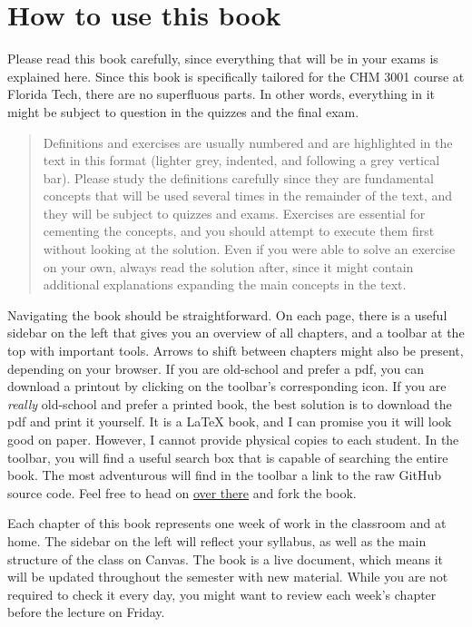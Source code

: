 \documentclass[
]{book}
\theoremstyle{definition}
\theoremstyle{definition}
\theoremstyle{definition}
\theoremstyle{remark}
\begin{document}
\hypertarget{how-to-use-this-book}{%
\section*{How to use this book}\label{how-to-use-this-book}}

Please read this book carefully, since everything that will be in your exams is explained here.
Since this book is specifically tailored for the CHM 3001 course at Florida Tech, there are no superfluous parts. In other words, everything in it might be subject to question in the quizzes and the final exam.

\begin{quote}
Definitions and exercises are usually numbered and are highlighted in the text in this format (lighter grey, indented, and following a grey vertical bar). Please study the definitions carefully since they are fundamental concepts that will be used several times in the remainder of the text, and they will be subject to quizzes and exams. Exercises are essential for cementing the concepts, and you should attempt to execute them first without looking at the solution. Even if you were able to solve an exercise on your own, always read the solution after, since it might contain additional explanations expanding the main concepts in the text.
\end{quote}

Navigating the book should be straightforward. On each page, there is a useful sidebar on the left that gives you an overview of all chapters, and a toolbar at the top with important tools. Arrows to shift between chapters might also be present, depending on your browser. If you are old-school and prefer a pdf, you can download a printout by clicking on the toolbar's corresponding icon. If you are \emph{really} old-school and prefer a printed book, the best solution is to download the pdf and print it yourself. It is a LaTeX book, and I can promise you it will look good on paper. However, I cannot provide physical copies to each student. In the toolbar, you will find a useful search box that is capable of searching the entire book. The most adventurous will find in the toolbar a link to the raw GitHub source code. Feel free to head on \href{https://github.com/peverati/PChem1}{over there} and fork the book.

Each chapter of this book represents one week of work in the classroom and at home. The sidebar on the left will reflect your syllabus, as well as the main structure of the class on Canvas. The book is a live document, which means it will be updated throughout the semester with new material. While you are not required to check it every day, you might want to review each week's chapter before the lecture on Friday.
\end{document}
